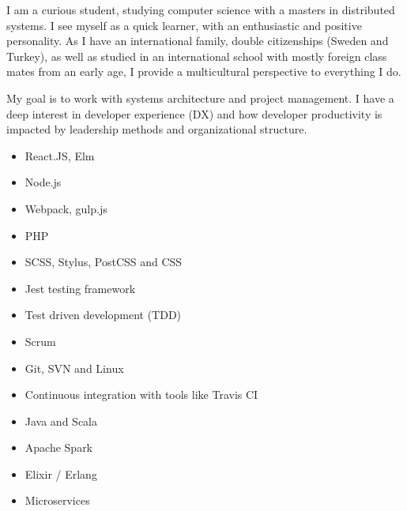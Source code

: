 I am a curious student, studying computer science with a masters in distributed systems. 
I see myself as a quick learner, with an enthusiastic and positive personality. As I have an international family, double citizenships (Sweden and Turkey), as well as studied in an international school with mostly foreign class mates from an early age, I provide a multicultural perspective to everything I do.

My goal is to work with systems architecture and project management. I have a deep interest in developer experience (DX) and how developer productivity is impacted by leadership methods and organizational structure.



\divider




\begin{itemize}
    \item React.JS, Elm
    \item Node.js
    \item Webpack, gulp.js
    \item PHP
    \item SCSS, Stylus, PostCSS and CSS
    \item Jest testing framework
\end{itemize}


\divider

\begin{itemize}
    \item Test driven development (TDD)
    \item Scrum
    \item Git, SVN and Linux
    \item Continuous integration with tools like Travis CI
    \item Java and Scala
    \item Apache Spark
    \item Elixir / Erlang
    \item Microservices
\end{itemize}





